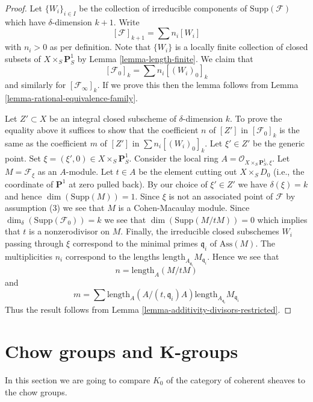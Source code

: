 \begin{proof}
Let $\{W_i\}_{i \in I}$ be the collection of irreducible
components of $\text{Supp}(\mathcal{F})$
which have $\delta$-dimension $k + 1$.
Write
$$
[\mathcal{F}]_{k + 1} = \sum n_i[W_i]
$$
with $n_i > 0$ as per definition. Note that $\{W_i\}$
is a locally finite collection of closed subsets of
$X \times_S \mathbf{P}^1_S$ by Lemma \ref{lemma-length-finite}.
We claim that
$$
[\mathcal{F}_0]_k = \sum n_i[(W_i)_0]_k
$$
and similarly for $[\mathcal{F}_\infty]_k$. If we prove this then the lemma
follows from Lemma \ref{lemma-rational-equivalence-family}.

\medskip\noindent
Let $Z' \subset X$ be an integral closed subscheme of $\delta$-dimension $k$.
To prove the equality above it suffices to show that the coefficient $n$
of $[Z']$ in $[\mathcal{F}_0]_k$ is the same as the coefficient $m$ of
$[Z']$ in $\sum n_i[(W_i)_0]_k$. Let $\xi' \in Z'$ be the generic point.
Set $\xi = (\xi', 0) \in  X \times_S \mathbf{P}^1_S$.
Consider the local ring $A = \mathcal{O}_{X \times_S \mathbf{P}^1_S, \xi}$.
Let $M = \mathcal{F}_\xi$ as an $A$-module.
Let $t \in A$ be the element cutting out $X \times_S D_0$
(i.e., the coordinate of $\mathbf{P}^1$ at zero pulled back).
By our choice of $\xi' \in Z'$ we have $\delta(\xi) = k$
and hence $\dim(\text{Supp}(M)) = 1$. Since $\xi$ is not an associated point
of $\mathcal{F}$ by assumption (3) we see that $M$ is a Cohen-Macaulay module.
Since $\dim_\delta(\text{Supp}(\mathcal{F}_0)) = k$
we see that $\dim(\text{Supp}(M/tM)) = 0$ which implies that $t$
is a nonzerodivisor on $M$. Finally, the irreducible closed subschemes
$W_i$ passing through $\xi$ correspond to the minimal primes
$\mathfrak q_i$ of $\text{Ass}(M)$. The multiplicities $n_i$ correspond
to the lengths $\text{length}_{A_{\mathfrak q_i}}M_{\mathfrak q_i}$.
Hence we see that
$$
n = \text{length}_A(M/tM)
$$
and
$$
m = \sum
\text{length}_A(A/(t, \mathfrak q_i)A)
\text{length}_{A_{\mathfrak q_i}}M_{\mathfrak q_i}
$$
Thus the result follows from
Lemma \ref{lemma-additivity-divisors-restricted}.
\end{proof}








\section{Chow groups and K-groups}
\label{section-chow-and-K}

\noindent
In this section we are going to compare $K_0$ of the
category of coherent sheaves to the chow groups.

